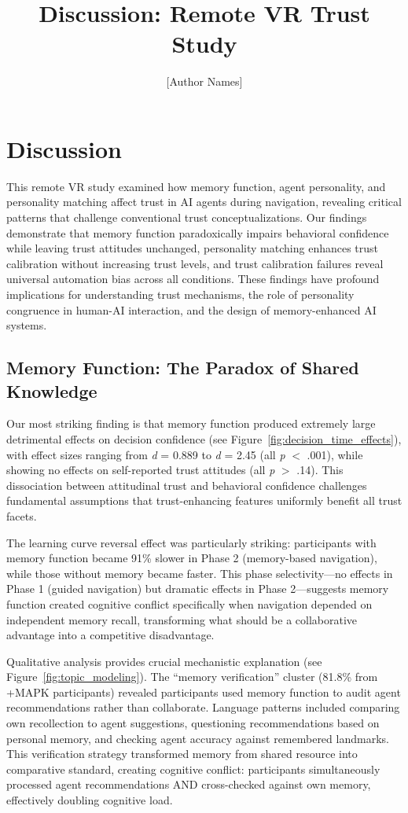 \documentclass[12pt]{article}
\title{\textbf{Discussion: Remote VR Trust Study}}
\author{[Author Names]}
\date{}
\begin{document}
\maketitle

\section{Discussion}

This remote VR study examined how memory function, agent personality, and personality matching affect trust in AI agents during navigation, revealing critical patterns that challenge conventional trust conceptualizations. Our findings demonstrate that memory function paradoxically impairs behavioral confidence while leaving trust attitudes unchanged, personality matching enhances trust calibration without increasing trust levels, and trust calibration failures reveal universal automation bias across all conditions. These findings have profound implications for understanding trust mechanisms, the role of personality congruence in human-AI interaction, and the design of memory-enhanced AI systems.

\subsection{Memory Function: The Paradox of Shared Knowledge}

Our most striking finding is that memory function produced extremely large detrimental effects on decision confidence (see Figure~\ref{fig:decision_time_effects}), with effect sizes ranging from \textit{d} = 0.889 to \textit{d} = 2.45 (all \textit{p} $<$ .001), while showing no effects on self-reported trust attitudes (all \textit{p} $>$ .14). This dissociation between attitudinal trust and behavioral confidence challenges fundamental assumptions that trust-enhancing features uniformly benefit all trust facets.

The learning curve reversal effect was particularly striking: participants with memory function became 91\% slower in Phase 2 (memory-based navigation), while those without memory became faster. This phase selectivity—no effects in Phase 1 (guided navigation) but dramatic effects in Phase 2—suggests memory function created cognitive conflict specifically when navigation depended on independent memory recall, transforming what should be a collaborative advantage into a competitive disadvantage.

Qualitative analysis provides crucial mechanistic explanation (see Figure~\ref{fig:topic_modeling}). The ``memory verification'' cluster (81.8\% from +MAPK participants) revealed participants used memory function to audit agent recommendations rather than collaborate. Language patterns included comparing own recollection to agent suggestions, questioning recommendations based on personal memory, and checking agent accuracy against remembered landmarks. This verification strategy transformed memory from shared resource into comparative standard, creating cognitive conflict: participants simultaneously processed agent recommendations AND cross-checked against own memory, effectively doubling cognitive load.
\end{document}

